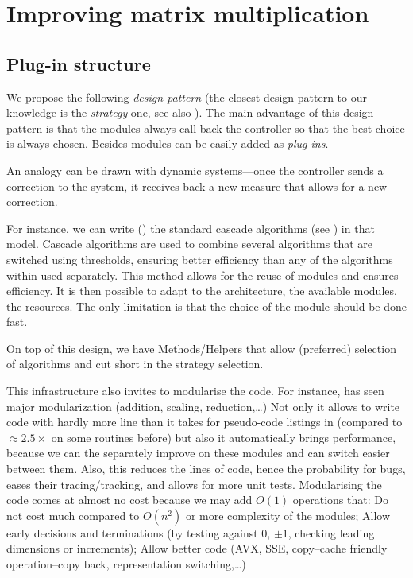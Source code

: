 \section{Improving \linbox matrix multiplication}\label{sec:matmul}
%
%
\subsection{Plug-in structure}
%
We propose the following \emph{design pattern} (the closest design pattern to our
knowledge is the \emph{strategy} one, see also \cite[Fig 2.]{Cung:2006:TC}).
The main advantage of this design pattern is that the modules always call back
the controller so that the best choice is always chosen.  Besides modules can
be easily added as \emph{plug-ins}.
%

%
An analogy can be drawn with dynamic
systems---once the controller sends a correction to the system, it receives
back a new measure that allows for a new correction.
%
%
%
\par
%
For instance, we can write () the standard cascade algorithms
(see \cite{Dumas:2008:Flas}) in that model. Cascade algorithms are used to combine
several algorithms that are switched using thresholds, ensuring better
efficiency than any of the algorithms within used separately.
%
%
%
This method allows for the reuse of modules and ensures efficiency.
It is then possible to adapt to the architecture, the available modules,
the resources. The only limitation is that the choice of the module
should be done fast.
%

%
On top of this design, we have Methods/Helpers that allow (preferred) selection
of algorithms and cut short in the strategy selection.
%
%
%
\par
%
This infrastructure also invites to modularise the code. For instance,
\fflasffpack has seen major  modularization (addition, scaling,
reduction,\ldots) Not only it allows to write code with hardly more line than
it takes for pseudo-code listings in \cite{Boyer:2009:sched} (compared to
$\approx 2.5\times$ on some routines before) but also it automatically brings
performance, because we can the separately improve on these modules and can
switch easier between them. Also, this reduces the lines of code, hence the
probability for bugs, eases their tracing/tracking, and allows for more
unit tests. Modularising the code comes at almost no cost because we may add
$O(1)$  operations that: Do not cost much compared to $O(n^2)$ or more
complexity of the modules; Allow early decisions and terminations (\eg by
testing against $0$, $\pm 1$, checking leading dimensions or increments);
Allow better code (AVX, SSE, copy--cache friendly operation--copy back,
representation switching,\ldots)
%

